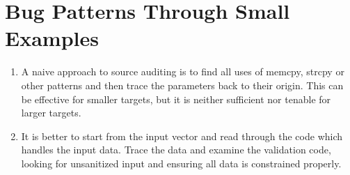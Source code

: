\documentclass[12pt]{Training}
\begin{document}

\section*{Bug Patterns Through Small Examples}
\begin{enumerate}
	\item A naive approach to source auditing is to find all uses of memcpy, strcpy or other patterns and then trace the parameters back to their origin. This can be effective for smaller targets, but it is neither sufficient nor tenable for larger targets.
	\item It is better to start from the input vector and read through the code which handles the input data. Trace the data and examine the validation code, looking for unsanitized input and ensuring all data is constrained properly.
\end{enumerate}
\end{document}
